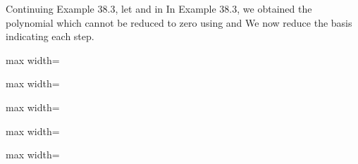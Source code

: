 \documentclass[11pt,oneside]{article}
\begin{document}
\begin{BookBody}
 Continuing Example 38.3, let  and  in  In Example 38.3, we obtained the polynomial  which cannot be reduced to zero using  and  We now reduce the basis  indicating each step.

\begin{center}\begin{adjustbox}{max width=\linewidth}\end{adjustbox}\end{center}

\begin{center}\begin{adjustbox}{max width=\linewidth}\end{adjustbox}\end{center}

\begin{center}\begin{adjustbox}{max width=\linewidth}\end{adjustbox}\end{center}

\begin{center}\begin{adjustbox}{max width=\linewidth}\end{adjustbox}\end{center}

\begin{center}\begin{adjustbox}{max width=\linewidth}\end{adjustbox}\end{center}


\end{BookBody}
\end{document}
